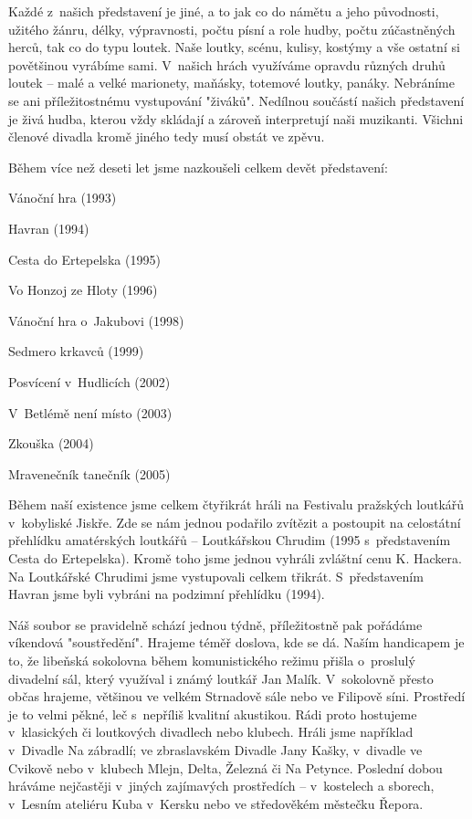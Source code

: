 \documentclass[a5paper, 11pt, twoside]{article}
\begin{document}
Každé z~našich představení je jiné, a to jak co do námětu a jeho
původnosti, užitého žánru, délky, výpravnosti, počtu písní a role hudby,
počtu zúčastněných herců, tak co do typu loutek. Naše loutky, scénu,
kulisy, kostýmy a vše ostatní si povětšinou vyrábíme sami. V~našich
hrách využíváme opravdu různých druhů loutek -- malé a velké marionety,
maňásky, totemové loutky, panáky. Nebráníme se ani příležitostnému
vystupování "živáků". Nedílnou součástí našich představení je živá
hudba, kterou vždy skládají a zároveň interpretují naši muzikanti.
Všichni členové divadla kromě jiného tedy musí obstát ve zpěvu.

Během více než deseti let jsme nazkoušeli celkem devět představení:

Vánoční hra (1993)

Havran (1994)

Cesta do Ertepelska (1995)

Vo Honzoj ze Hloty (1996)

Vánoční hra o~Jakubovi (1998)

Sedmero krkavců (1999)

Posvícení v~Hudlicích (2002)

V~Betlémě není místo (2003)

Zkouška (2004)

Mravenečník tanečník (2005)

Během naší existence jsme celkem čtyřikrát hráli na Festivalu pražských
loutkářů v~kobyliské Jiskře. Zde se nám jednou podařilo zvítězit a
postoupit na celostátní přehlídku amatérských loutkářů -- Loutkářskou
Chrudim (1995 s~představením Cesta do Ertepelska). Kromě toho jsme
jednou vyhráli zvláštní cenu K. Hackera. Na Loutkářské Chrudimi jsme
vystupovali celkem třikrát. S~představením Havran jsme byli vybráni na
podzimní přehlídku (1994).

Náš soubor se pravidelně schází jednou týdně, příležitostně pak pořádáme
víkendová "soustředění". Hrajeme téměř doslova, kde se dá. Naším
handicapem je to, že libeňská sokolovna během komunistického režimu
přišla o~proslulý divadelní sál, který využíval i známý loutkář Jan
Malík. V~sokolovně přesto občas hrajeme, většinou ve velkém Strnadově
sále nebo ve Filipově síni. Prostředí je to velmi pěkné, leč s~nepříliš
kvalitní akustikou. Rádi proto hostujeme v~klasických či loutkových
divadlech nebo klubech. Hráli jsme například v~Divadle Na zábradlí; ve
zbraslavském Divadle Jany Kašky, v~divadle ve Cvikově nebo v~klubech
Mlejn, Delta, Železná či Na Petynce. Poslední dobou hráváme nejčastěji
v~jiných zajímavých prostředích -- v~kostelech a sborech, v~Lesním
ateliéru Kuba v~Kersku nebo ve středověkém městečku Řepora.
\end{document}
